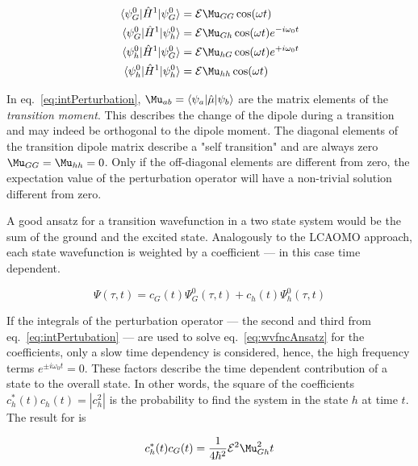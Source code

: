 			\begin{equation}
			\label{eq:intPerturbation}
			\begin{split}
				\langle \psi_G^0|\hat{H}^1|\psi_G^0 \rangle &= \mathcal{E}\Mu_{GG}\cos(\omega t) \\ 
				\langle \psi_G^0|\hat{H}^1|\psi_h^0 \rangle &= \mathcal{E}\Mu_{Gh}\cos(\omega t)e^{-i\omega_0t} \\ 
				\langle \psi_h^0|\hat{H}^1|\psi_G^0 \rangle &= \mathcal{E}\Mu_{hG}\cos(\omega t)e^{+i\omega_0t} \\ 
				\langle \psi_h^0|\hat{H}^1|\psi_h^0 \rangle &= \mathcal{E}\Mu_{hh}\cos(\omega t) 
			\end{split}
			\end{equation}

			In eq.~\ref{eq:intPerturbation}, $\Mu_{ab} = \langle \psi_a|\hat{\mu}|\psi_b \rangle$ are the matrix elements of the \emph{transition moment}. This describes the change of the dipole during a transition and may indeed be orthogonal to the dipole moment. The diagonal elements of the transition dipole matrix describe a "self transition" and are always zero $\Mu_{GG} = \Mu_{hh} = 0$. Only if the off-diagonal elements are different from zero, the expectation value of the perturbation operator will have a non-trivial solution different from zero.

			A good ansatz for a transition wavefunction in a two state system would be the sum of the ground and the excited state. Analogously to the LCAOMO approach, each state wavefunction is weighted by a coefficient --- in this case time dependent. 

			\begin{equation}
				\label{eq:wvfncAnsatz}
				\Psi(\tau , t) = c_G(t)\Psi^0_G(\tau , t) + c_h(t)\Psi^0_h(\tau , t)
			\end{equation} 

			If the integrals of the perturbation operator --- the second and third from eq.~\ref{eq:intPertubation} --- are used to solve eq.~\ref{eq:wvfncAnsatz} for the coefficients, only a slow time dependency is considered, hence, the high frequency terms $e^{\pm i\omega_0t} = 0$. These factors describe the time dependent contribution of a state to the overall state. In other words, the square of the coefficients $c_h^{\ast}(t)c_h(t) = \left|c_h^2\right|$ is the probability to find the system in the state $h$ at time $t$. The result for is

			\begin{equation}
				\label{eq:transProb}
				c_h^{\ast}(t)c_G(t) = \frac{1}{4\hbar^2} \mathcal{E}^2\Mu^2_{Gh} t
			\end{equation} 

